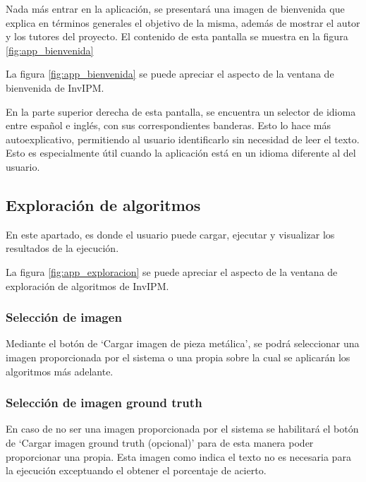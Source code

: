Nada más entrar en la aplicación, se presentará una imagen de bienvenida que explica en términos generales el objetivo de la misma, además de mostrar el autor y los tutores del proyecto. El contenido de esta pantalla se muestra en la figura \ref{fig:app_bienvenida}


La figura \ref{fig:app_bienvenida} se puede apreciar el aspecto de la ventana de bienvenida de InvIPM.

En la parte superior derecha de esta pantalla, se encuentra un selector de idioma entre español e inglés, con sus correspondientes banderas. Esto lo hace más autoexplicativo, permitiendo al usuario identificarlo sin necesidad de leer el texto. Esto es especialmente útil cuando la aplicación está en un idioma diferente al del usuario.

\subsection{Exploración de algoritmos}\label{exploración-de-algoritmos}

En este apartado, es donde el usuario puede cargar, ejecutar y visualizar los resultados de la ejecución.


La figura \ref{fig:app_exploracion} se puede apreciar el aspecto de la ventana de exploración de algoritmos de InvIPM.

\subsubsection{Selección de imagen}\label{selección-de-imagen}

Mediante el botón de `Cargar imagen de pieza metálica', se podrá seleccionar una imagen proporcionada por el sistema o una propia sobre la cual se aplicarán los algoritmos más adelante.

\subsubsection{Selección de imagen ground truth}\label{selección-de-imagen-ground-truth}

En caso de no ser una imagen proporcionada por el sistema se habilitará el botón de `Cargar imagen ground truth (opcional)' para de esta manera poder proporcionar una propia. Esta imagen como indica el texto no es necesaria para la ejecución exceptuando el obtener el porcentaje de acierto.

